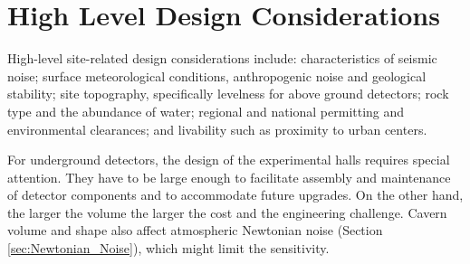 \section{High Level Design Considerations}
\label{Req:Fac_Inf}
High-level site-related design considerations include: characteristics of seismic noise; surface meteorological conditions, anthropogenic noise and geological stability; site topography, specifically levelness for above ground detectors; rock type and the abundance of water; regional and national permitting and environmental clearances; and livability such as proximity to urban centers.  


For underground detectors, the design of the experimental halls requires special attention. They have to be large enough to facilitate assembly and maintenance of detector components and to accommodate future upgrades. On the other hand, the larger the volume the larger the cost and the engineering challenge. Cavern volume and shape also affect atmospheric Newtonian noise (Section \ref{sec:Newtonian_Noise}), which might limit the sensitivity.

